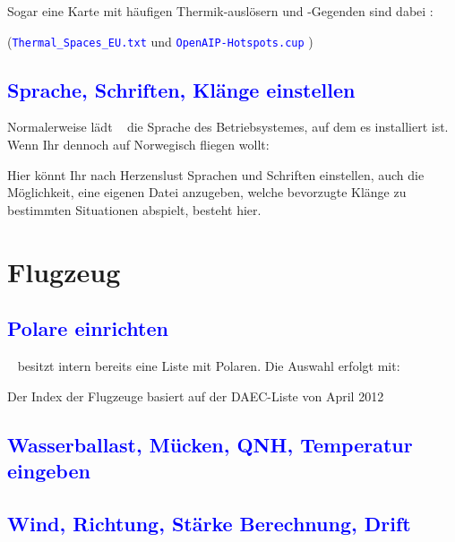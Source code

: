 Sogar eine Karte mit häufigen Thermik-auslösern und -Gegenden sind dabei :

({\large\texttt{\textcolor{blue}{Thermal\_Spaces\_EU.txt}}} und {\large\texttt{\textcolor{blue}{OpenAIP-Hotspots.cup}}} )  


\subsection*{\textcolor{blue}{Sprache, Schriften, Klänge  einstellen}}
Normalerweise lädt \xc~ die Sprache des Betriebsystemes, auf dem es installiert ist.
Wenn Ihr dennoch auf Norwegisch fliegen wollt:

\bc\sk\blink{}\blink{}\ec

Hier könnt Ihr nach Herzenslust Sprachen und Schriften einstellen, auch die Möglichkeit, eine
eigenen Datei anzugeben, welche bevorzugte Klänge zu bestimmten Situationen abspielt,
besteht hier.
\newpage\section{Flugzeug}
\subsection*{\textcolor{blue}{Polare einrichten}}
\xc~ besitzt intern bereits eine Liste mit Polaren. Die Auswahl erfolgt mit:
\bc\sk\blink{}\blink{}\ec
\begin{small}Der Index der Flugzeuge basiert auf der DAEC-Liste von April  {\textsf 2012} \end{small}
\subsection*{\textcolor{blue}{Wasserballast, Mücken, QNH, Temperatur eingeben}}
\bc{}\blink{}\ec
\subsection*{\textcolor{blue}{Wind, Richtung, Stärke Berechnung, Drift}}
\bc{}\blink{}\ec
